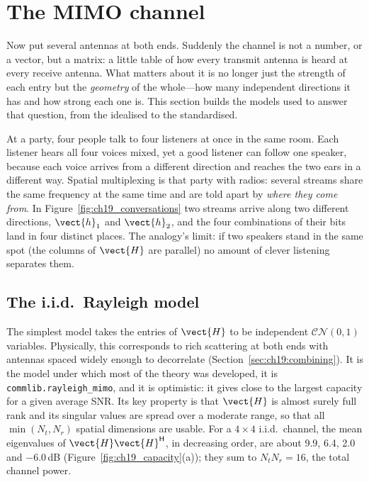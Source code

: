 
\section{The MIMO channel}
\label{sec:ch19:channel}

Now put several antennas at both ends. Suddenly the channel is not a number, or a vector, but a
matrix: a little table of how every transmit antenna is heard at every receive antenna. What
matters about it is no longer just the strength of each entry but the \emph{geometry} of the
whole---how many independent directions it has and how strong each one is. This section builds the
models used to answer that question, from the idealised to the standardised.

\begin{analogy}
At a party, four people talk to four listeners at once in the same room. Each listener hears all
four voices mixed, yet a good listener can follow one speaker, because each voice arrives from a
different direction and reaches the two ears in a different way. Spatial multiplexing is that
party with radios: several streams share the same frequency at the same time and are told apart by
\emph{where they come from}. In Figure~\ref{fig:ch19_conversations} two streams arrive along two
different directions, $\vect{h}_1$ and $\vect{h}_2$, and the four combinations of their bits land
in four distinct places. The analogy's limit: if two speakers stand in the same spot (the columns of
$\vect{H}$ are parallel) no amount of clever listening separates them.
\end{analogy}

\subsection{The i.i.d.\ Rayleigh model}

The simplest model takes the entries of $\vect{H}$ to be independent $\mathcal{CN}(0,1)$ variables.
Physically, this corresponds to rich scattering at both ends with antennas spaced widely enough to
decorrelate (Section~\ref{sec:ch19:combining}). It is the model under which most of the theory was
developed, it is \texttt{commlib.rayleigh\_mimo}, and it is optimistic: it gives close to the largest
capacity for a given average SNR. Its key property is that $\vect{H}$ is almost surely full rank
and its singular values are spread over a moderate range, so that all $\min(N_t,N_r)$ spatial
dimensions are usable. For a $4\times4$ i.i.d.\ channel, the mean eigenvalues of
$\vect{H}\vect{H}^{\mathsf H}$, in decreasing order, are about 9.9, 6.4, 2.0 and $-6.0$\,dB
(Figure~\ref{fig:ch19_capacity}(a)); they sum to $N_tN_r=16$, the total channel power.

